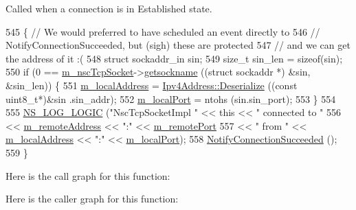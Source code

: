 Called when a connection is in Established state. 


\begin{DoxyCode}
545 \{ \textcolor{comment}{// We would preferred to have scheduled an event directly to}
546   \textcolor{comment}{// NotifyConnectionSucceeded, but (sigh) these are protected}
547   \textcolor{comment}{// and we can get the address of it :(}
548   \textcolor{keyword}{struct }sockaddr\_in sin;
549   \textcolor{keywordtype}{size\_t} sin\_len = \textcolor{keyword}{sizeof}(sin);
550   \textcolor{keywordflow}{if} (0 == \hyperlink{classns3_1_1NscTcpSocketImpl_a540a25a7e3ea5777872b16662da3e616}{m\_nscTcpSocket}->\hyperlink{structINetStreamSocket_a3f72a54af5a17e8110e1e26b4d99f7a7}{getsockname} ((\textcolor{keyword}{struct} sockaddr *) &sin, &sin\_len)) \{
551       \hyperlink{classns3_1_1NscTcpSocketImpl_ad7a63092b598e001f4e8825e3ee30cc3}{m\_localAddress} = \hyperlink{classns3_1_1Ipv4Address_ac6e205258d95465ce51c148e51590760}{Ipv4Address::Deserialize} ((\textcolor{keyword}{const} uint8\_t*)&sin
      .sin\_addr);
552       \hyperlink{classns3_1_1NscTcpSocketImpl_aa591275dc269c0d7b803d83ccd3279aa}{m\_localPort} = ntohs (sin.sin\_port);
553     \}
554 
555   \hyperlink{group__logging_ga88acd260151caf2db9c0fc84997f45ce}{NS\_LOG\_LOGIC} (\textcolor{stringliteral}{"NscTcpSocketImpl "} << \textcolor{keyword}{this} << \textcolor{stringliteral}{" connected to "}
556                                     << \hyperlink{classns3_1_1NscTcpSocketImpl_aa61f63cf0fa0e3fe3e02a5a90224caf9}{m\_remoteAddress} << \textcolor{stringliteral}{":"} << 
      \hyperlink{classns3_1_1NscTcpSocketImpl_ad0094ba92f10c47bc783acf5c15026b7}{m\_remotePort}
557                                     << \textcolor{stringliteral}{" from "} << \hyperlink{classns3_1_1NscTcpSocketImpl_ad7a63092b598e001f4e8825e3ee30cc3}{m\_localAddress} << \textcolor{stringliteral}{":"} << 
      \hyperlink{classns3_1_1NscTcpSocketImpl_aa591275dc269c0d7b803d83ccd3279aa}{m\_localPort});
558   \hyperlink{classns3_1_1Socket_a2f55d195304131b356818bc74134c5a7}{NotifyConnectionSucceeded} ();
559 \}
\end{DoxyCode}


Here is the call graph for this function\+:




Here is the caller graph for this function\+:


